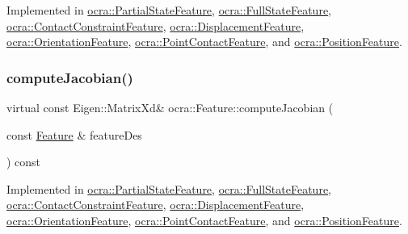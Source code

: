 Implemented in \hyperlink{classocra_1_1PartialStateFeature_a946499ed311c24cb0cd9953b51b7d170}{ocra\+::\+Partial\+State\+Feature}, \hyperlink{classocra_1_1FullStateFeature_af5d860acbb9dc600a432fcba952f95a7}{ocra\+::\+Full\+State\+Feature}, \hyperlink{classocra_1_1ContactConstraintFeature_afbe828f952c7583b690e394efd05423f}{ocra\+::\+Contact\+Constraint\+Feature}, \hyperlink{classocra_1_1DisplacementFeature_a684821d2a83945c63661eacdf4bcd262}{ocra\+::\+Displacement\+Feature}, \hyperlink{classocra_1_1OrientationFeature_abf35648fec0b8744710cfd9da704cbbf}{ocra\+::\+Orientation\+Feature}, \hyperlink{classocra_1_1PointContactFeature_a536bd532919a1a7f37a97aed625112b1}{ocra\+::\+Point\+Contact\+Feature}, and \hyperlink{classocra_1_1PositionFeature_a3bf7b70beb60e5e2a4975a157f7b6c19}{ocra\+::\+Position\+Feature}.

\hypertarget{classocra_1_1Feature_a4fb8eeeed978a1f727ec43cd1bd18d78}{}\label{classocra_1_1Feature_a4fb8eeeed978a1f727ec43cd1bd18d78} 
\subsubsection{\texorpdfstring{compute\+Jacobian()}{computeJacobian()}\hspace{0.1cm}{\footnotesize\ttfamily [1/2]}}
{\footnotesize\ttfamily virtual const Eigen\+::\+Matrix\+Xd\& ocra\+::\+Feature\+::compute\+Jacobian (\begin{DoxyParamCaption}\item[{const \hyperlink{classocra_1_1Feature}{Feature} \&}]{feature\+Des }\end{DoxyParamCaption}) const\hspace{0.3cm}{\ttfamily [pure virtual]}}



Implemented in \hyperlink{classocra_1_1PartialStateFeature_a8b70dbff8a1a06f16621d34b3e8bc5cf}{ocra\+::\+Partial\+State\+Feature}, \hyperlink{classocra_1_1FullStateFeature_abcd0254d7836bea5531d49afff872d20}{ocra\+::\+Full\+State\+Feature}, \hyperlink{classocra_1_1ContactConstraintFeature_a7b0fc26f03104eb02a7ba565b99a41d7}{ocra\+::\+Contact\+Constraint\+Feature}, \hyperlink{classocra_1_1DisplacementFeature_a87b3ef89ea6711a3f953f94e5cdf7e4d}{ocra\+::\+Displacement\+Feature}, \hyperlink{classocra_1_1OrientationFeature_a14327a30bae8c06ea241aeeb19a48631}{ocra\+::\+Orientation\+Feature}, \hyperlink{classocra_1_1PointContactFeature_a68a3025a23aa9ff8bec2aeb0c966c352}{ocra\+::\+Point\+Contact\+Feature}, and \hyperlink{classocra_1_1PositionFeature_a9e609b86dcc917313b34853547738ca5}{ocra\+::\+Position\+Feature}.

